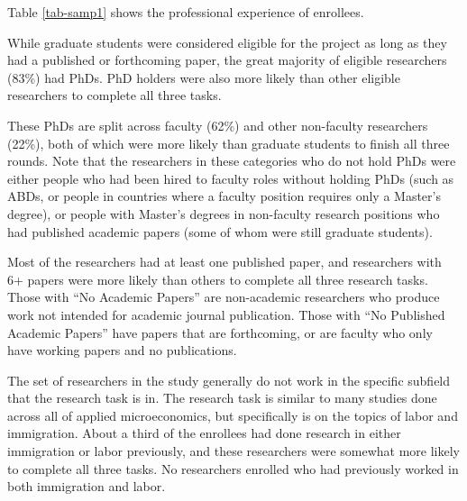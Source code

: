 \documentclass[
  letterpaper,
  DIV=11,
  numbers=noendperiod]{scrartcl}
\begin{document}
Table \ref{tab-samp1} shows the professional experience of enrollees.

While graduate students were considered eligible for the project as long
as they had a published or forthcoming paper, the great majority of
eligible researchers (83\%) had PhDs. PhD holders were also more likely
than other eligible researchers to complete all three tasks.

These PhDs are split across faculty (62\%) and other non-faculty
researchers (22\%), both of which were more likely than graduate
students to finish all three rounds. Note that the researchers in these
categories who do not hold PhDs were either people who had been hired to
faculty roles without holding PhDs (such as ABDs, or people in countries
where a faculty position requires only a Master's degree), or people
with Master's degrees in non-faculty research positions who had
published academic papers (some of whom were still graduate students).

Most of the researchers had at least one published paper, and
researchers with 6+ papers were more likely than others to complete all
three research tasks. Those with ``No Academic Papers'' are non-academic
researchers who produce work not intended for academic journal
publication. Those with ``No Published Academic Papers'' have papers
that are forthcoming, or are faculty who only have working papers and no
publications.

The set of researchers in the study generally do not work in the
specific subfield that the research task is in. The research task is
similar to many studies done across all of applied microeconomics, but
specifically is on the topics of labor and immigration. About a third of
the enrollees had done research in either immigration or labor
previously, and these researchers were somewhat more likely to complete
all three tasks. No researchers enrolled who had previously worked in
both immigration and labor.
\end{document}
